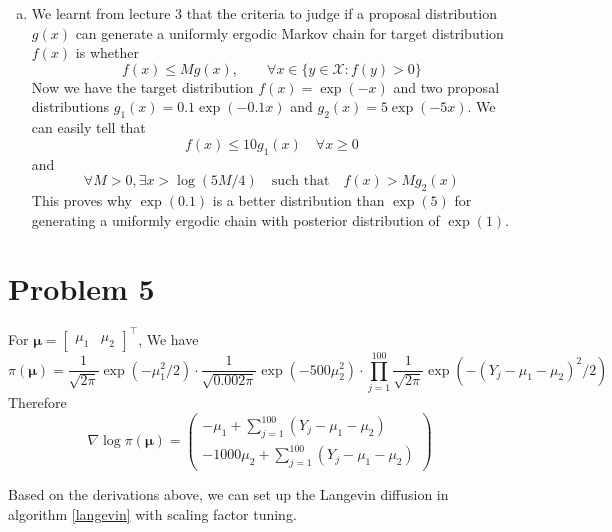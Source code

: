 \documentclass[12pt]{article}
\begin{document}
\begin{enumerate}[(a)]
	\item We learnt from lecture 3 that the criteria to judge if a proposal distribution $g(x)$ can generate a uniformly ergodic Markov chain for target distribution $f(x)$ is whether
	\[ f(x) \leq Mg(x), \qquad \forall x \in \{ y\in \mathcal{X}: f(y)>0 \} \]
	Now we have the target distribution $f(x) = \exp(-x)$ and two proposal distributions $g_1(x) = 0.1\exp(-0.1x)$ and $g_2(x)=5\exp(-5x)$. We can easily tell that 
	\[ f(x)\leq 10g_1(x)\quad \forall x\geq 0 \]
	and 
	\[ \forall M>0, \exists x>\log(5M/4)\quad \text{such that}\quad f(x) > Mg_2(x) \]
	This proves why $\exp(0.1)$ is a better distribution than $\exp(5)$ for generating a uniformly ergodic chain with posterior distribution of $\exp(1)$.
\end{enumerate}



\section*{Problem 5}


 For $\bm{\mu} = \begin{bmatrix}\mu_1 & \mu_2\end{bmatrix}^\top$, We have 
 \[ \pi (\bm{\mu}) = \frac{1}{\sqrt{2\pi}} \exp\left( -\mu_1^2/2\right)\cdot \frac{1}{\sqrt{0.002\pi}}\exp\left( -500\mu_2^2\right)\cdot \prod_{j=1}^{100}\frac{1}{\sqrt{2\pi}} \exp \left(-(Y_j - \mu_1 - \mu_2)^2 / 2 \right)  \] 
Therefore
\[ \nabla \log \pi(\bm{\mu}) = \begin{pmatrix}
	-\mu_1 + \sum_{j=1}^{100}(Y_j - \mu_1 - \mu_2) \\
	-1000 \mu_2 + \sum_{j=1}^{100}(Y_j - \mu_1 - \mu_2)
 \end{pmatrix} \]

Based on the derivations above, we can set up the Langevin diffusion in algorithm \ref{langevin} with scaling factor tuning. 
\end{document}
